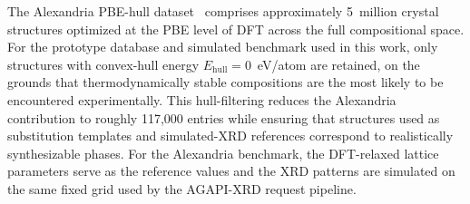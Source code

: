 \documentclass[pdflatex,sn-mathphys-num]{sn-jnl}
\theoremstyle{thmstyleone}
\theoremstyle{thmstyletwo}
\theoremstyle{thmstylethree}
\begin{document}
  The Alexandria PBE-hull dataset~\cite{alexandria} comprises approximately                                                                                                       
  5~million crystal structures optimized at the PBE level of DFT across the full                                                                                                  
  compositional space. For the prototype database and simulated benchmark used in                                                                                                 
  this work, only structures with convex-hull energy $E_{\mathrm{hull}} = 0$~eV/atom                                                                                              
  are retained, on the grounds that thermodynamically stable compositions are the                                                                                                 
  most likely to be encountered experimentally. This hull-filtering reduces the                                                                                                   
  Alexandria contribution to roughly 117,000 entries while ensuring that structures                                                                                               
  used as substitution templates and simulated-XRD references correspond to                                                                                                       
  realistically synthesizable phases. For the Alexandria benchmark, the DFT-relaxed                                                                                               
  lattice parameters serve as the reference values and the XRD patterns are                                                                                                       
  simulated on the same fixed grid used by the AGAPI-XRD request pipeline.                                                                                                        
                                                                                                                                                                                  
\end{document}
